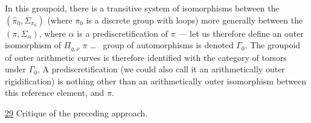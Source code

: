 

In this groupoid, there is a transitive system of isomorphisms between the  $(\widehat{\pi}_0,\overline{\Sigma}_{\pi_0})$ (where $\pi_0$ is a discrete group with loops) more generally between the $(\pi,\Sigma_\alpha)$, where $\alpha$  is a prediscretification of $\pi$ --- let us therefore define an  outer isomorphism of $\Pi_{g,\nu}$
$\pi$ \ldots\  group of  automorphisms is denoted $\Gamma_0$. The  groupoid of  outer arithmetic curves is therefore identified with the category of torsors under $\Gamma_0$,
A prediscretification (we could also call it an arithmetically outer rigidification) is  nothing other than an arithmetically outer isomorphism between this reference element, and $\pi$.


\uline{29} Critique of the preceding approach.

